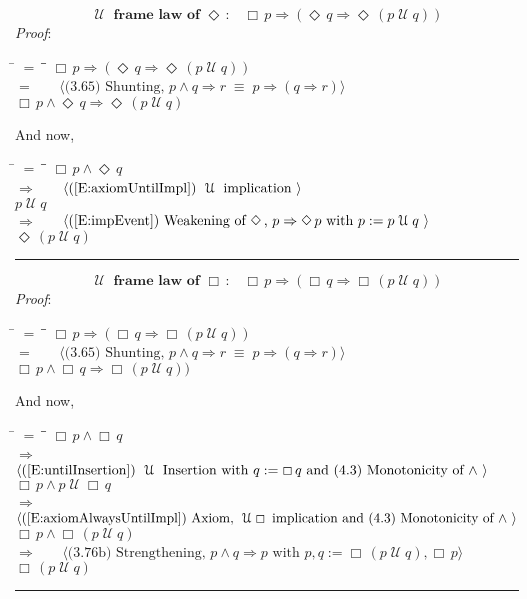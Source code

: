 \documentclass[12pt, fleqn, leqno]{article}
\newcommand{\lgap}{2pt}                             %
\newcommand{\mymathindent}{24pt}                    %
\newcommand{\equivs}{\ensuremath{\;\equiv\;}}       %
\newcommand{\impl}{\ensuremath{\Rightarrow}}        %
\newcommand{\Until}{\;\mathcal{U}\;}
\newcommand{\Event}{\Diamond\,}
\newcommand{\Always}{\Box\,}
\newcommand{\myqed}{\rule[-.23ex]{1.2ex}{2.0ex}}
\newcommand{\myqedtab}{\hspace{384pt}}              %
\newcommand{\Gll} {\langle}                         %
\newcommand{\Ggg} {\rangle}                         %
\newcommand{\Hint}[1]     {\ \ \ $\Gll              \mbox{#1} \Ggg$ }   %
\begin{document}
\begin{equation}\label{E:untilframelawEvent}
\textbf{$\Until$ frame law of $\Event$:}\quad \Always p \impl (\Event q \impl \Event (p \Until q))
\end{equation}
\emph{Proof}:
\begin{tabbing}
\hspace{\mymathindent} \= $= \;$ \= \myqedtab \= \kill
  \> \>   $\Always p \impl (\Event q \impl \Event (p \Until q))$\\[\lgap]
  \> $=$  \>  \Hint{(3.65) Shunting, $p\land q\impl r\equivs p\impl (q\impl r)$}\\[\lgap]
  \> \>   $\Always p \land \Event q \impl \Event (p \Until q)$
\end{tabbing}
And now,
\begin{tabbing}
\hspace{\mymathindent} \= $= \;$ \= \myqedtab \= \kill
  \> \>   $\Always p \land \Event q $\\[\lgap]
   \> $\impl$ \> \Hint{(\ref{E:axiomUntilImpl}) $\Until$ implication } \\[\lgap]
   \> \>   $p \Until q $\\[\lgap]
  \> $\impl$  \>  \Hint{(\ref{E:impEvent}) Weakening of $\Event$, $p \impl \Event p$ with $p := p \Until q$ }\\[\lgap]
  \> \>   $\Event (p \Until q) $\quad \myqed
\end{tabbing}

\begin{equation}\label{E:untilframelawAlways}
\textbf{$\Until$ frame law of $\Always$:}\quad \Always p \impl (\Always q \impl \Always (p \Until q))
\end{equation}
\emph{Proof}:
\begin{tabbing}
\hspace{\mymathindent} \= $= \;$ \= \myqedtab \= \kill
  \> \>   $\Always p \impl (\Always q \impl \Always (p \Until q))$\\[\lgap]
  \> $=$  \>  \Hint{(3.65) Shunting, $p\land q\impl r\equivs p\impl (q\impl r)$}\\[\lgap]
  \> \>   $\Always p \land \Always q \impl \Always (p \Until q))$
\end{tabbing}
And now,
\begin{tabbing}
\hspace{\mymathindent} \= $= \;$ \= \myqedtab \= \kill
  \> \>   $\Always p \land \Always q $\\[\lgap]
  \> $\impl$ \> \Hint{(\ref{E:untilInsertion}) $\Until$ Insertion with $q:=\Always q$ and (4.3) Monotonicity of $\land$ } \\[\lgap]
  \> \>   $\Always p \land p \Until \Always q $\\[\lgap]
   \> $\impl$ \> \Hint{(\ref{E:axiomAlwaysUntilImpl}) Axiom, $\Until\Always$ implication and (4.3) Monotonicity of $\land$  } \\[\lgap]
   \> \>   $\Always p \land \Always (p \Until  q) $\\[\lgap]
  \> $\impl$ \> \Hint{(3.76b) Strengthening, $p\land q \impl p$ with $p,q := \Always (p \Until q), \Always p$} \\[\lgap]
  \> \>   $\Always (p \Until q) $\quad \myqed
\end{tabbing}
\end{document}
